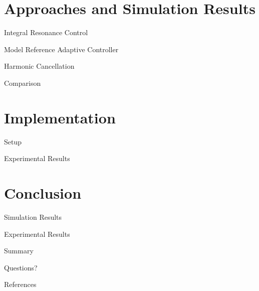 \documentclass[10pt]{beamer}
\begin{document}
\section{Approaches and Simulation Results}

\begin{frame}{Integral Resonance Control}
\end{frame}

\begin{frame}{Model Reference Adaptive Controller}
\end{frame}

\begin{frame}{Harmonic Cancellation}
\end{frame}

\begin{frame}{Comparison}
\end{frame}

\section{Implementation}

\begin{frame}{Setup}
\end{frame}

\begin{frame}{Experimental Results}
\end{frame}


\section{Conclusion}

\begin{frame}{Simulation Results}
\end{frame}

\begin{frame}{Experimental Results}
\end{frame}

\begin{frame}{Summary}
\end{frame}

\begin{frame}[standout]
  Questions?
\end{frame}

\appendix

\begin{frame}[allowframebreaks]{References}

  
  

\end{frame}
\end{document}
